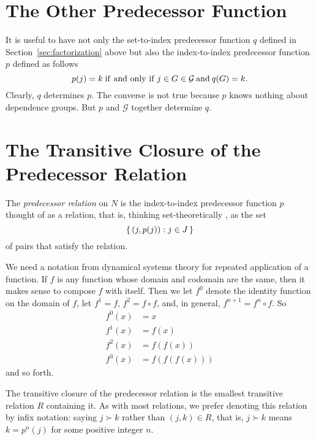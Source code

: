 \section{The Other Predecessor Function}
\label{sec:other}

It is useful to have not only the set-to-index predecessor function $q$
defined in Section~\ref{sec:factorization} above but also the index-to-index
predecessor function $p$ defined as follows
$$
   p(j) = k \mathrel{\rm if\ and\ only\ if} j \in G \in \mathcal{G} \mathbin{\rm and} q(G) = k.
$$
Clearly, $q$ determines $p$.
The converse is not true because $p$ knows nothing about dependence groups.
But $p$ and $\mathcal{G}$ together determine $q$.

\section{The Transitive Closure of the Predecessor Relation}
\label{sec:closure}

The \emph{predecessor relation} on $N$ is the index-to-index predecessor
function $p$ thought
of as a relation, that is, thinking set-theoretically
\citep[Section~7]{halmos-set-theory}, as the set
$$
   \{\,  (j, p(j)) : j \in J  \,\}
$$
of pairs that satisfy the relation.

We need a notation from dynamical systems theory for repeated application
of a function.  If $f$ is any function whose domain and codomain are the same,
then it makes sense to compose $f$ with itself.  Then we let $f^0$ denote
the identity function on the domain of $f$, let $f^1 = f$, $f^2 = f \circ f$,
and, in general, $f^{n + 1} = f^n \circ f$.
So
\begin{align*}
   f^0(x) & = x
   \\
   f^1(x) & = f(x)
   \\
   f^2(x) & = f(f(x))
   \\
   f^3(x) & = f(f(f(x)))
\end{align*}
and so forth.

The transitive closure of the predecessor relation
is the smallest transitive relation $R$ containing it.
As with most relations, we prefer denoting this relation by infix notation:
saying $j \succ k$ rather than $(j, k) \in R$, that is, $j \succ k$ means
$k = p^n(j)$ for some positive integer $n$.

